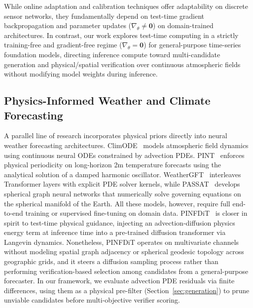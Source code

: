 \documentclass[preprint,12pt]{elsarticle}
\begin{document}
While online adaptation and calibration techniques offer adaptability on discrete sensor networks, they fundamentally depend on test-time gradient backpropagation and parameter updates ($\nabla_\theta \neq \mathbf{0}$) on domain-trained architectures. In contrast, our work explores test-time computing in a strictly training-free and gradient-free regime ($\nabla_\theta = \mathbf{0}$) for general-purpose time-series foundation models, directing inference compute toward multi-candidate generation and physical/spatial verification over continuous atmospheric fields without modifying model weights during inference.

\subsection{Physics-Informed Weather and Climate Forecasting}
A parallel line of research incorporates physical priors directly into neural weather forecasting architectures. ClimODE~\citep{verma2024climode} models atmospheric field dynamics using continuous neural ODEs constrained by advection PDEs. PINT~\citep{park2025pint} enforces physical periodicity on long-horizon 2m temperature forecasts using the analytical solution of a damped harmonic oscillator. WeatherGFT~\citep{xu2024weathergft} interleaves Transformer layers with explicit PDE solver kernels, while PASSAT~\citep{zheng2025passat} develops spherical graph neural networks that numerically solve governing equations on the spherical manifold of the Earth. All these models, however, require full end-to-end training or supervised fine-tuning on domain data. PINFDiT~\citep{cao2026pinfdit} is closer in spirit to test-time physical guidance, injecting an advection-diffusion physics energy term at inference time into a pre-trained diffusion transformer via Langevin dynamics. Nonetheless, PINFDiT operates on multivariate channels without modeling spatial graph adjacency or spherical geodesic topology across geographic grids, and it steers a diffusion sampling process rather than performing verification-based selection among candidates from a general-purpose forecaster. In our framework, we evaluate advection PDE residuals via finite differences, using them as a physical pre-filter (Section~\ref{sec:generation}) to prune unviable candidates before multi-objective verifier scoring.
\end{document}
